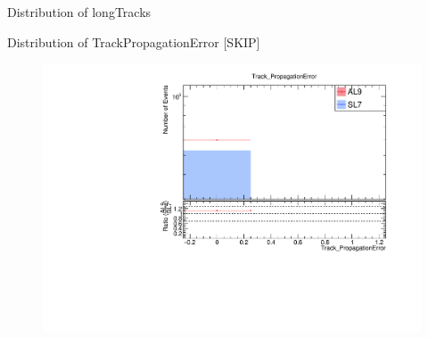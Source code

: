 \begin{frame}{Distribution of longTracks}

\end{frame}

\begin{frame}{Distribution of TrackPropagationError [SKIP]}
    \begin{figure}
        \includegraphics[width=\linewidth]{output/Track_PropagationError.pdf}
    \end{figure}
\end{frame}

